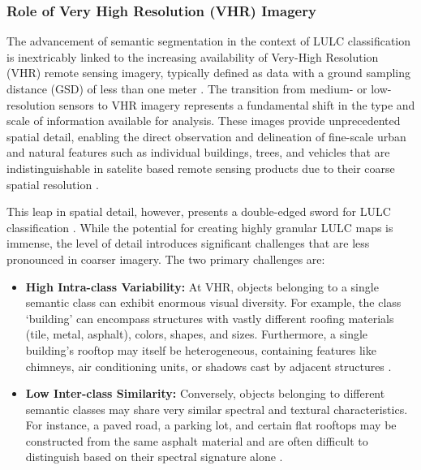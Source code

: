 \documentclass{report}
\begin{document}
\subsubsection{Role of Very High Resolution (VHR) Imagery}
The advancement of semantic segmentation in the context of LULC classification is inextricably linked to the increasing availability of Very-High Resolution (VHR) remote sensing imagery, typically defined as data with a ground sampling distance (GSD) of less than one meter \parencites[p.~2;]{NeupaneEtAlDeepLearningBasedSemanticSegmentationUrbanFeaturesSatelliteImagesReviewMetaAnalysis2021}[p.~3147]{XuEtAlsemanticsegmentationmethodcategoryboundaryLandUseLandCoverLULCmappingVeryHighResolutionVHRremotesensingimage2021}. The transition from medium- or low-resolution sensors to VHR imagery represents a fundamental shift in the type and scale of information available for analysis. These images provide unprecedented spatial detail, enabling the direct observation and delineation of fine-scale urban and natural features such as individual buildings, trees, and vehicles that are indistinguishable in satelite based remote sensing products due to their coarse spatial resolution \parencites[p.~3147]{XuEtAlsemanticsegmentationmethodcategoryboundaryLandUseLandCoverLULCmappingVeryHighResolutionVHRremotesensingimage2021}. \par
This leap in spatial detail, however, presents a double-edged sword for LULC classification \parencites[p.~2]{NeupaneEtAlDeepLearningBasedSemanticSegmentationUrbanFeaturesSatelliteImagesReviewMetaAnalysis2021}. While the potential for creating highly granular LULC maps is immense, the level of detail introduces significant challenges that are less pronounced in coarser imagery. The two primary challenges are:
\begin{itemize}
\item \textbf{High Intra-class Variability:} At VHR, objects belonging to a single semantic class can exhibit enormous visual diversity. For example, the class ‘building’ can encompass structures with vastly different roofing materials (tile, metal, asphalt), colors, shapes, and sizes. Furthermore, a single building's rooftop may itself be heterogeneous, containing features like chimneys, air conditioning units, or shadows cast by adjacent structures \parencites[p.~2;]{NeupaneEtAlDeepLearningBasedSemanticSegmentationUrbanFeaturesSatelliteImagesReviewMetaAnalysis2021}[p.~2]{SertelEtAlLandUseLandCoverMappingUsingDeepLearningBasedSegmentationApproachesVHRWorldview3Images2022}.
\item \textbf{Low Inter-class Similarity:} Conversely, objects belonging to different semantic classes may share very similar spectral and textural characteristics. For instance, a paved road, a parking lot, and certain flat rooftops may be constructed from the same asphalt material and are often difficult to distinguish based on their spectral signature alone \parencites[p.~2]{NeupaneEtAlDeepLearningBasedSemanticSegmentationUrbanFeaturesSatelliteImagesReviewMetaAnalysis2021}.
\end{itemize}
\end{document}
